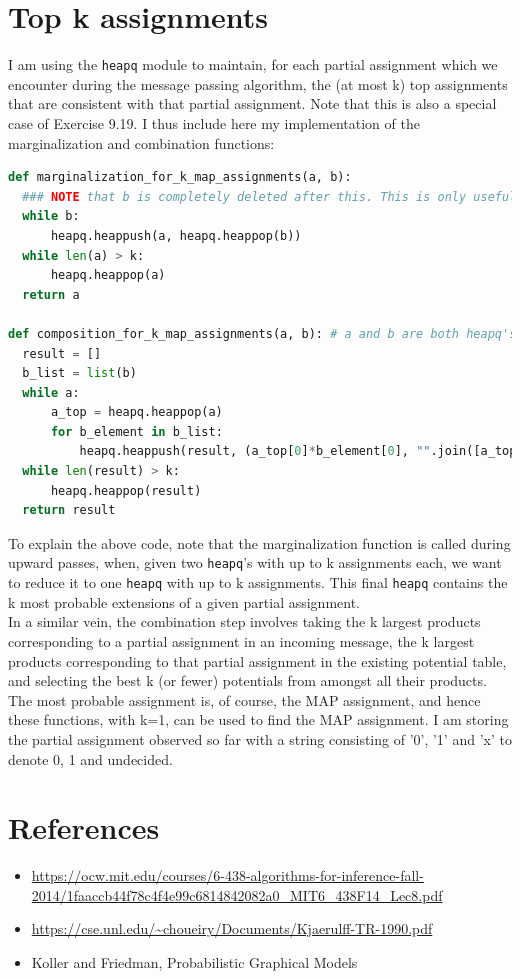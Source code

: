 \documentclass{article}
\begin{document}
\section{Top k assignments}
I am using the \texttt{heapq} module to maintain, for each partial assignment which we encounter during the message passing algorithm, the (at most k) top assignments that are consistent with that partial assignment. Note that this is also a special case of Exercise 9.19. I thus include here my implementation of the marginalization and combination functions:
\begin{lstlisting}[language=Python]
  def marginalization_for_k_map_assignments(a, b):
  ### NOTE that b is completely deleted after this. This is only useful when there is no backward pass needed, as in our case
  while b:
      heapq.heappush(a, heapq.heappop(b))
  while len(a) > k: 
      heapq.heappop(a)
  return a
  
def composition_for_k_map_assignments(a, b): # a and b are both heapq's
  result = []
  b_list = list(b)
  while a:
      a_top = heapq.heappop(a)
      for b_element in b_list:
          heapq.heappush(result, (a_top[0]*b_element[0], "".join([a_top[1][i] if a_top[1][i]!='x' else b_element[1][i] for i in range(len(a_top[1]))])))
  while len(result) > k:
      heapq.heappop(result)
  return result
\end{lstlisting}
To explain the above code, note that the marginalization function is called during upward passes, when, given two \texttt{heapq}'s with up to k assignments each, we want to reduce it to one \texttt{heapq} with up to k assignments. This final \texttt{heapq} contains the k most probable extensions of a given partial assignment.\\
In a similar vein, the combination step involves taking the k largest products corresponding to a partial assignment in an incoming message, the k largest products corresponding to that partial assignment in the existing potential table, and selecting the best k (or fewer) potentials from amongst all their products.\\
The most probable assignment is, of course, the MAP assignment, and hence these functions, with k=1, can be used to find the MAP assignment.
I am storing the partial assignment observed so far with a string consisting of '0', '1' and 'x' to denote 0, 1 and undecided.
\section{References}
\begin{itemize}
  \item \url{https://ocw.mit.edu/courses/6-438-algorithms-for-inference-fall-2014/1faaccb44f78c4f4e99c6814842082a0_MIT6_438F14_Lec8.pdf}
  \item \url{https://cse.unl.edu/~choueiry/Documents/Kjaerulff-TR-1990.pdf}
  \item Koller and Friedman, Probabilistic Graphical Models
\end{itemize}
\end{document}
